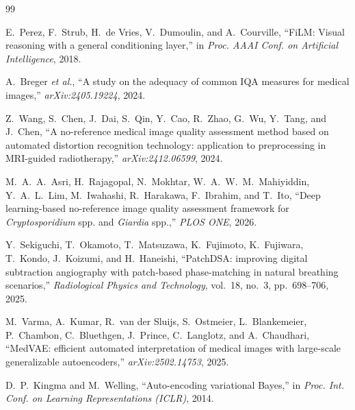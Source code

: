 \documentclass[conference]{IEEEtran}
\begin{document}
\begin{thebibliography}{99}

E.~Perez, F.~Strub, H.~de Vries, V.~Dumoulin, and A.~Courville,
``FiLM: Visual reasoning with a general conditioning layer,'' in
\emph{Proc. AAAI Conf. on Artificial Intelligence}, 2018.

A.~Breger \emph{et al.}, ``A study on the adequacy of common IQA measures
for medical images,'' \emph{arXiv:2405.19224}, 2024.

Z.~Wang, S.~Chen, J.~Dai, S.~Qin, Y.~Cao, R.~Zhao, G.~Wu, Y.~Tang, and
J.~Chen, ``A no-reference medical image quality assessment method based on
automated distortion recognition technology: application to preprocessing
in MRI-guided radiotherapy,'' \emph{arXiv:2412.06599}, 2024.

M.~A.~A.~Asri, H.~Rajagopal, N.~Mokhtar, W.~A.~W.~M.~Mahiyiddin,
Y.~A.~L.~Lim, M.~Iwahashi, R.~Harakawa, F.~Ibrahim, and T.~Ito,
``Deep learning-based no-reference image quality assessment framework for
\emph{Cryptosporidium} spp. and \emph{Giardia} spp.,'' \emph{PLOS ONE},
2026.

Y.~Sekiguchi, T.~Okamoto, T.~Matsuzawa, K.~Fujimoto, K.~Fujiwara,
T.~Kondo, J.~Koizumi, and H.~Haneishi, ``PatchDSA: improving digital
subtraction angiography with patch-based phase-matching in natural
breathing scenarios,'' \emph{Radiological Physics and Technology}, vol.~18,
no.~3, pp.~698--706, 2025.

M.~Varma, A.~Kumar, R.~van der Sluijs, S.~Ostmeier, L.~Blankemeier,
P.~Chambon, C.~Bluethgen, J.~Prince, C.~Langlotz, and A.~Chaudhari,
``MedVAE: efficient automated interpretation of medical images with
large-scale generalizable autoencoders,'' \emph{arXiv:2502.14753}, 2025.

D.~P.~Kingma and M.~Welling, ``Auto-encoding variational Bayes,'' in
\emph{Proc. Int. Conf. on Learning Representations (ICLR)}, 2014.

\end{thebibliography}

\end{document}
